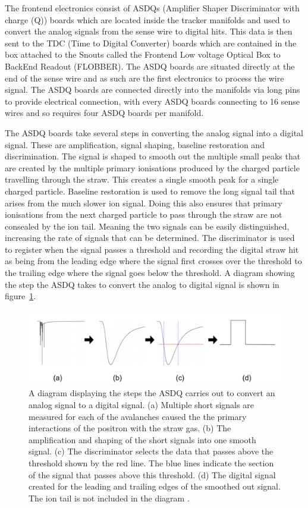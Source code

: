 The frontend electronics consist of ASDQs (Amplifier Shaper Discriminator with charge (Q)) boards which are located inside the tracker manifolds and used to convert the analog signals from the sense wire to digital hits. This data is then sent to the TDC (Time to Digital Converter) boards which are contained in the box attached to the Snouts called the Frontend Low voltage Optical Box to BackEnd Readout (FLOBBER). The ASDQ boards are situated directly at the end of the sense wire and as such are the first electronics to process the wire signal. The ASDQ boards are connected directly into the manifolds via long pins to provide electrical connection, with every ASDQ boards connecting to 16 sense wires and so requires four ASDQ boards per manifold.

The ASDQ boards take several steps in converting the analog signal into a digital signal. These are amplification, signal shaping, baseline restoration and discrimination. The signal is shaped to smooth out the multiple small peaks that are created by the multiple primary ionisations produced by the charged particle travelling through the straw. This creates a single smooth peak for a single charged particle. Baseline restoration is used to remove the long signal tail that arises from the much slower ion signal. Doing this also ensures that primary ionisations from the next charged particle to pass through the straw are not consealed by the ion tail. Meaning the two signals can be easily distinguished, increasing the rate of signals that can be determined. The discriminator is used to register when the signal passes a threshold and recording the digital straw hit as being from the leading edge where the signal first crosses over the threshold to the trailing edge where the signal goes below the threshold. A diagram showing the step the ASDQ takes to convert the analog to digital signal is shown in figure~\ref{fig:asdqsignalpath}.

\begin{figure}[th]
\centering
\includegraphics[scale=0.48]{Figures/asdqsignalpath.png}
\decoRule
\caption{A diagram displaying the steps the ASDQ carries out to convert an analog signal to a digital signal. (a) Multiple short signals are measured for each of the avalanches caused the the primary interactions of the positron with the straw gas. (b) The amplification and shaping of the short signals into one smooth signal. (c) The discriminator selects the data that passes above the threshold shown by the red line. The blue lines indicate the section of the signal that passes above this threshold. (d) The digital signal created for the leading and trailing edges of the smoothed out signal. The ion tail is not included in the diagram \cite{analogtodigital}.}
\label{fig:asdqsignalpath}
\end{figure}

